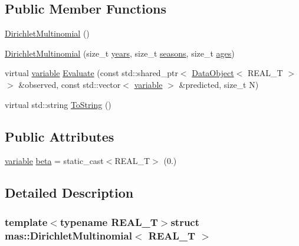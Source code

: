 \subsection*{Public Member Functions}
\begin{DoxyCompactItemize}
\item 
\hyperlink{structmas_1_1_dirichlet_multinomial_ac61d68fab90c2403c5def6943df1273c}{Dirichlet\-Multinomial} ()
\item 
\hyperlink{structmas_1_1_dirichlet_multinomial_ae9f8e90ada24b8179a2f45392c854375}{Dirichlet\-Multinomial} (size\-\_\-t \hyperlink{structmas_1_1_n_l_l_functor_ac76e5d7e0808486b42ffdaea952dd19f}{years}, size\-\_\-t \hyperlink{structmas_1_1_n_l_l_functor_ac59c36239b1817b5bb357bf90dc4802d}{seasons}, size\-\_\-t \hyperlink{structmas_1_1_n_l_l_functor_aa70e461c812bff95770cda5dbb79b6b9}{ages})
\item 
virtual \hyperlink{structmas_1_1_dirichlet_multinomial_a8e6915521c8c414ac50b545e6b77c4dd}{variable} \hyperlink{structmas_1_1_dirichlet_multinomial_ab65ba0749c9c746694ab4994e85e0a66}{Evaluate} (const std\-::shared\-\_\-ptr$<$ \hyperlink{structmas_1_1_data_object}{Data\-Object}$<$ R\-E\-A\-L\-\_\-\-T $>$ $>$ \&observed, const std\-::vector$<$ \hyperlink{structmas_1_1_dirichlet_multinomial_a8e6915521c8c414ac50b545e6b77c4dd}{variable} $>$ \&predicted, size\-\_\-t N)
\item 
virtual std\-::string \hyperlink{structmas_1_1_dirichlet_multinomial_a92d0abed181db2f54d7d44ac7cb4fa27}{To\-String} ()
\end{DoxyCompactItemize}
\subsection*{Public Attributes}
\begin{DoxyCompactItemize}
\item 
\hyperlink{structmas_1_1_dirichlet_multinomial_a8e6915521c8c414ac50b545e6b77c4dd}{variable} \hyperlink{structmas_1_1_dirichlet_multinomial_ac3ca50f28dcc152d0dc3d28866bb0e3e}{beta} = static\-\_\-cast$<$R\-E\-A\-L\-\_\-\-T$>$ (0.)
\end{DoxyCompactItemize}


\subsection{Detailed Description}
\subsubsection*{template$<$typename R\-E\-A\-L\-\_\-\-T$>$struct mas\-::\-Dirichlet\-Multinomial$<$ R\-E\-A\-L\-\_\-\-T $>$}



